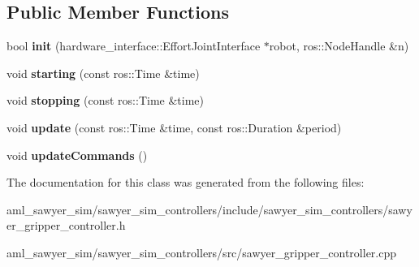 \subsection*{Public Member Functions}
\begin{DoxyCompactItemize}
\item 
\hypertarget{classsawyer__sim__controllers_1_1_sawyer_gripper_controller_a1ec8be47c61f65d266be72d5f585b81a}{bool {\bfseries init} (hardware\-\_\-interface\-::\-Effort\-Joint\-Interface $\ast$robot, ros\-::\-Node\-Handle \&n)}\label{classsawyer__sim__controllers_1_1_sawyer_gripper_controller_a1ec8be47c61f65d266be72d5f585b81a}

\item 
\hypertarget{classsawyer__sim__controllers_1_1_sawyer_gripper_controller_ae21e93ad155b85594e3db41248cd5bed}{void {\bfseries starting} (const ros\-::\-Time \&time)}\label{classsawyer__sim__controllers_1_1_sawyer_gripper_controller_ae21e93ad155b85594e3db41248cd5bed}

\item 
\hypertarget{classsawyer__sim__controllers_1_1_sawyer_gripper_controller_a67a70310cfb974e92ae21257ab979b21}{void {\bfseries stopping} (const ros\-::\-Time \&time)}\label{classsawyer__sim__controllers_1_1_sawyer_gripper_controller_a67a70310cfb974e92ae21257ab979b21}

\item 
\hypertarget{classsawyer__sim__controllers_1_1_sawyer_gripper_controller_a062034615ce7904a90a3eb1cf21f5185}{void {\bfseries update} (const ros\-::\-Time \&time, const ros\-::\-Duration \&period)}\label{classsawyer__sim__controllers_1_1_sawyer_gripper_controller_a062034615ce7904a90a3eb1cf21f5185}

\item 
\hypertarget{classsawyer__sim__controllers_1_1_sawyer_gripper_controller_a93680b62cdd6a4b1cfd9fa9184ba653b}{void {\bfseries update\-Commands} ()}\label{classsawyer__sim__controllers_1_1_sawyer_gripper_controller_a93680b62cdd6a4b1cfd9fa9184ba653b}

\end{DoxyCompactItemize}


The documentation for this class was generated from the following files\-:\begin{DoxyCompactItemize}
\item 
aml\-\_\-sawyer\-\_\-sim/sawyer\-\_\-sim\-\_\-controllers/include/sawyer\-\_\-sim\-\_\-controllers/sawyer\-\_\-gripper\-\_\-controller.\-h\item 
aml\-\_\-sawyer\-\_\-sim/sawyer\-\_\-sim\-\_\-controllers/src/sawyer\-\_\-gripper\-\_\-controller.\-cpp\end{DoxyCompactItemize}
